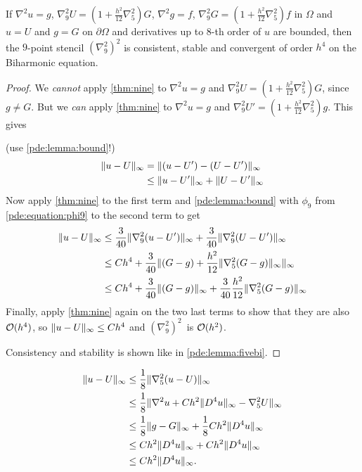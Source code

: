 \begin{theorem}
If $\nabla^2 u = g$, $\nabla_9^2 U = (1+\frac{h^2}{12} \nabla_5^2 ) G$, $\nabla^2 g = f$, $\nabla_9^2 G = (1+\frac{h^2}{12} \nabla_5^2) f$ in $\Omega$ and $u=U$ and $g=G$ on $\partial \Omega$ and derivatives up to $8$-th order of $u$ are bounded, 
then the $9$-point stencil $(\nabla_9^2)^2$ is consistent, stable and convergent of order $h^4$ on the Biharmonic equation.
\end{theorem}
\begin{proof}
We \emph{cannot} apply \cref{thm:nine} to $\nabla^2 u = g$ and $\nabla_9^2 U = (1 + \frac{h^2}{12} \nabla_5^2) G$, since $g \neq G$.
But we \emph{can} apply \cref{thm:nine} to $\nabla^2 u = g$ and $\nabla_9^2 U' = (1 + \frac{h^2}{12} \nabla_5^2) g$.
This gives

(use \cref{pde:lemma:bound}!)
\begin{equation*}
\begin{split}
	\lVert u-U \rVert_\infty &=    \lVert (u-U') - (U-U') \rVert_\infty \\
                &\leq \lVert u-U' \rVert_\infty + \lVert U-U' \rVert_\infty \\
\end{split}
\end{equation*}
Now apply \cref{thm:nine} to the first term and \cref{pde:lemma:bound} with $\phi_9$ from \ref{pde:equation:phi9} to the second term to get
\begin{equation*}
\begin{split}
	\lVert u-U \rVert_\infty &\leq \frac{3}{40} \lVert \nabla_9^2(u-U') \rVert_\infty + \frac{3}{40} \lVert \nabla_9^2(U-U') \rVert_\infty \\
				&\leq Ch^4 + \frac{3}{40} \lVert (G-g)+\frac{h^2}{12} \lVert \nabla_5^2 (G-g) \rVert_\infty \rVert_\infty\\
				&\leq Ch^4 + \frac{3}{40} \lVert (G-g) \rVert_\infty + \frac{3}{40} \frac{h^2}{12} \lVert \nabla_5^2 (G-g) \rVert_\infty \\
\end{split}
\end{equation*}
Finally, apply \cref{thm:nine} again on the two last terms to show that they are also $\mathcal{O}(h^4)$, so $\lVert u-U \rVert_\infty \leq Ch^4$ and $(\nabla_9^2)^2$ is $\mathcal{O}(h^2)$.

Consistency and stability is shown like in \cref{pde:lemma:fivebi}.
\end{proof}

\begin{equation*}
\begin{split}
\lVert u-U \rVert_\infty &\leq \frac18 \lVert \nabla_5^2(u-U) \rVert_\infty \\
            &\leq \frac18 \lVert \nabla^2 u + Ch^2 \lVert D^4 u \rVert_\infty - \nabla_5^2 U \rVert_\infty \\
			&\leq \frac18 \lVert g - G \rVert_\infty + \frac18 Ch^2 \lVert D^4 u \rVert_\infty \\
			&\leq C h^2 \lVert D^4 u \rVert_\infty + Ch^2 \lVert D^4 u \rVert_\infty \\
			&\leq C h^2 \lVert D^4 u \rVert_\infty.
\end{split}
\end{equation*}


